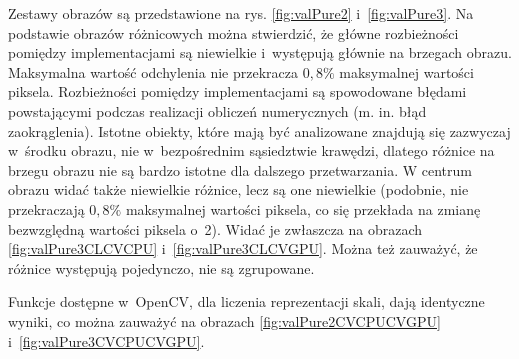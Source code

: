 Zestawy obrazów są przedstawione na rys. \ref{fig:valPure2} i~\ref{fig:valPure3}. Na podstawie obrazów różnicowych można stwierdzić, że główne rozbieżności pomiędzy implementacjami są niewielkie i~występują głównie na brzegach obrazu. Maksymalna wartość odchylenia nie przekracza $ 0,8\% $ maksymalnej wartości piksela. Rozbieżności pomiędzy implementacjami są spowodowane błędami powstającymi podczas realizacji obliczeń numerycznych (m. in. błąd zaokrąglenia). Istotne obiekty, które mają być analizowane znajdują się zazwyczaj w~środku obrazu, nie w~bezpośrednim sąsiedztwie krawędzi, dlatego różnice na brzegu obrazu nie są bardzo istotne dla dalszego przetwarzania. W centrum obrazu widać także niewielkie różnice, lecz są one niewielkie (podobnie, nie przekraczają $ 0,8\% $ maksymalnej wartości piksela, co się przekłada na zmianę bezwzględną wartości piksela o~2). Widać je zwłaszcza na obrazach \ref{fig:valPure3CLCVCPU} i~\ref{fig:valPure3CLCVGPU}. Można też zauważyć, że różnice występują pojedynczo, nie są zgrupowane.

Funkcje dostępne w~OpenCV, dla liczenia reprezentacji skali, dają identyczne wyniki, co można zauważyć na obrazach \ref{fig:valPure2CVCPUCVGPU} i~\ref{fig:valPure3CVCPUCVGPU}.

